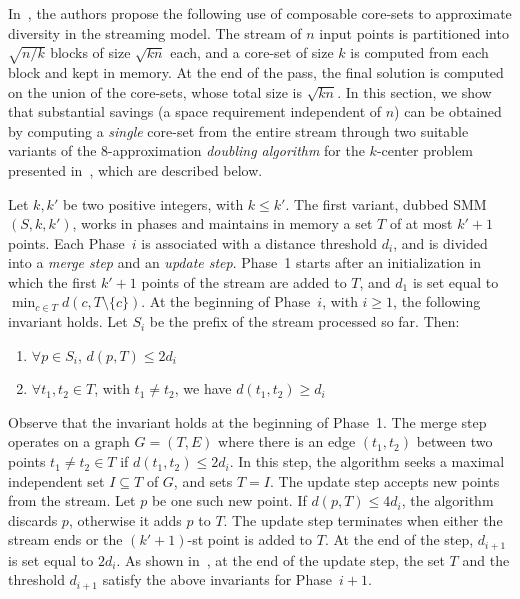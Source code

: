 \documentclass{article}
\begin{document}
In~\cite{IndykMMM14}, the authors propose the following use of
composable core-sets to approximate diversity in the streaming
model. The stream of $n$ input points is partitioned into $\sqrt{n/k}$
blocks of size $\sqrt{kn}$ each, and a core-set of size $k$ is
computed from each block and kept in memory. At the end of the pass,
the final solution is computed on the union of the core-sets, whose
total size is $\sqrt{kn}$. In this section, we show that substantial
savings (a space requirement independent of $n$) can be obtained by
computing a \emph{single} core-set from the entire stream through two
suitable variants of the 8-approximation \emph{doubling algorithm} for
the $k$-center problem presented in~\cite{CharikarCFM04}, which are
described below.

Let $k,k'$ be two positive integers, with $k \le k'$. The first
variant, dubbed {\sc SMM}$(S, k, k')$, works in phases and maintains in memory
a set $T$ of at most $k' + 1$ points. Each Phase~$i$ is associated
with a distance threshold $d_i$, and is divided into a \emph{merge
  step} and an \emph{update step}. Phase~1 starts after an
initialization in which the first $k'+1$ points of the stream are
added to $T$, and $d_1$ is set equal to
$\min_{c\in T}d(c, T \setminus\{c\})$. At the beginning of Phase~$i$,
with $i \geq 1$, the following invariant holds. Let $S_i$ be the
prefix of the stream processed so far. Then:
\begin{enumerate}
\item $\forall p \in S_i$, $d(p, T) \le 2d_i$
\item $\forall t_1, t_2 \in T$, with $t_1 \neq t_2$, we have $d(t_1,
  t_2) \ge d_i$
\end{enumerate}

Observe that the invariant holds at the beginning of Phase~1.  The
merge step operates on a graph $G=(T,E)$ where there is an edge
$(t_1,t_2)$ between two points $t_1 \neq t_2 \in T$ if
$d(t_1, t_2) \le 2d_i$. In this step, the algorithm seeks a maximal
independent set $I \subseteq T$ of $G$, and sets $T=I$. The update
step accepts new points from the stream. Let $p$ be one such new
point. If $d(p, T) \le 4d_i$, the algorithm discards $p$, otherwise it
adds $p$ to $T$. The update step terminates when either the stream
ends or the $(k'+1)$-st point is added to $T$. At the end of the step,
$d_{i+1}$ is set equal to $2d_i$. As shown in~\cite{CharikarCFM04}, at
the end of the update step, the set $T$ and the threshold $d_{i+1}$
satisfy the above invariants for Phase~$i+1$.
\end{document}

